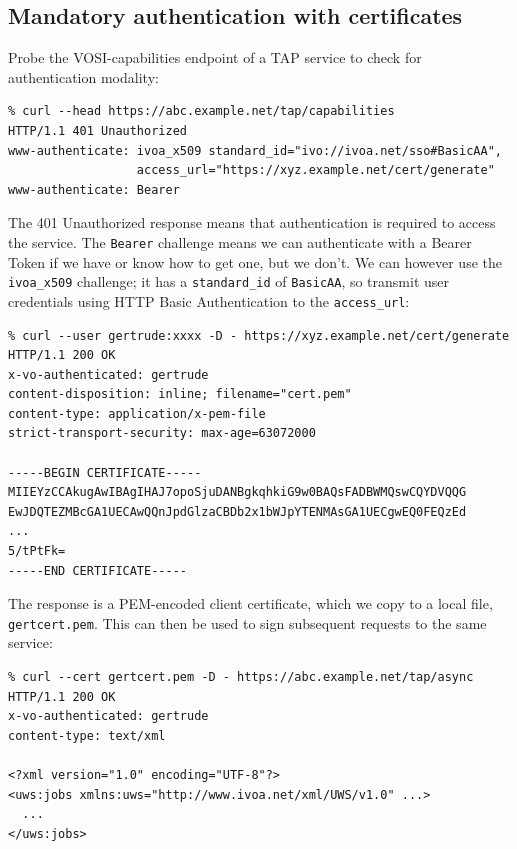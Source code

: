 \documentclass[11pt,a4paper]{ivoa}
\begin{document}
\subsection{Mandatory authentication with certificates}
\label{sec:x509-example}


Probe the VOSI-capabilities endpoint of a TAP service to check
for authentication modality:
{\footnotesize
\begin{verbatim}
% curl --head https://abc.example.net/tap/capabilities
HTTP/1.1 401 Unauthorized
www-authenticate: ivoa_x509 standard_id="ivo://ivoa.net/sso#BasicAA",
                  access_url="https://xyz.example.net/cert/generate"
www-authenticate: Bearer
\end{verbatim}
}

\noindent
The 401 Unauthorized response means that authentication
is required to access the service.
The \verb|Bearer| challenge means we can authenticate with
a Bearer Token if we have or know how to get one, but we don't.
We can however use the \verb|ivoa_x509| challenge;
it has a \verb|standard_id| of \verb|BasicAA|,
so transmit user credentials using
HTTP Basic Authentication to the \verb|access_url|:

{\footnotesize
\begin{verbatim}
% curl --user gertrude:xxxx -D - https://xyz.example.net/cert/generate
HTTP/1.1 200 OK
x-vo-authenticated: gertrude
content-disposition: inline; filename="cert.pem"
content-type: application/x-pem-file
strict-transport-security: max-age=63072000

-----BEGIN CERTIFICATE-----
MIIEYzCCAkugAwIBAgIHAJ7opoSjuDANBgkqhkiG9w0BAQsFADBWMQswCQYDVQQG
EwJDQTEZMBcGA1UECAwQQnJpdGlzaCBDb2x1bWJpYTENMAsGA1UECgwEQ0FEQzEd
...
5/tPtFk=
-----END CERTIFICATE-----
\end{verbatim}
}

\noindent
The response is a PEM-encoded client certificate, which we copy
to a local file, \verb|gertcert.pem|.
This can then be used to sign subsequent requests to the same service:
{\footnotesize
\begin{verbatim}
% curl --cert gertcert.pem -D - https://abc.example.net/tap/async
HTTP/1.1 200 OK
x-vo-authenticated: gertrude
content-type: text/xml

<?xml version="1.0" encoding="UTF-8"?>
<uws:jobs xmlns:uws="http://www.ivoa.net/xml/UWS/v1.0" ...>
  ...
</uws:jobs>
\end{verbatim}
}
\end{document}
